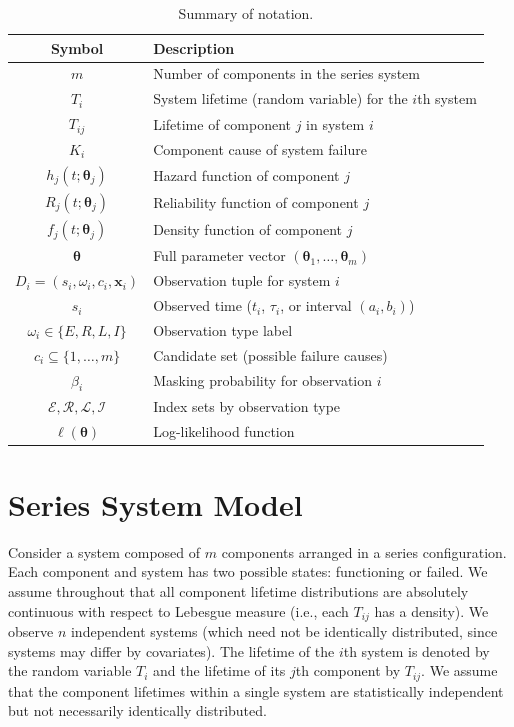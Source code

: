 \documentclass[11pt]{article}
\theoremstyle{definition}
\theoremstyle{plain}
\renewcommand{\v}[1]{\boldsymbol{#1}}
\newcommand{\btheta}{\v{\theta}}
\begin{document}
\begin{table}[ht]
\centering
\caption{Summary of notation.}
\label{tab:notation}
\small
\renewcommand{\arraystretch}{1.15}
\begin{tabular}{@{}cl@{}}
\toprule
\textbf{Symbol} & \textbf{Description} \\
\midrule
$m$ & Number of components in the series system \\
$T_i$ & System lifetime (random variable) for the $i$th system \\
$T_{ij}$ & Lifetime of component $j$ in system $i$ \\
$K_i$ & Component cause of system failure \\
$h_j(t; \v{\theta}_j)$ & Hazard function of component $j$ \\
$R_j(t; \v{\theta}_j)$ & Reliability function of component $j$ \\
$f_j(t; \v{\theta}_j)$ & Density function of component $j$ \\
$\btheta$ & Full parameter vector $(\v{\theta}_1, \ldots, \v{\theta}_m)$ \\
$D_i = (s_i, \omega_i, c_i, \v{x}_i)$ & Observation tuple for system $i$ \\
$s_i$ & Observed time ($t_i$, $\tau_i$, or interval $(a_i, b_i)$) \\
$\omega_i \in \{E, R, L, I\}$ & Observation type label \\
$c_i \subseteq \{1,\ldots,m\}$ & Candidate set (possible failure causes) \\
$\beta_i$ & Masking probability for observation $i$ \\
$\mathcal{E}, \mathcal{R}, \mathcal{L}, \mathcal{I}$
    & Index sets by observation type \\
$\ell(\btheta)$ & Log-likelihood function \\
\bottomrule
\end{tabular}
\end{table}

\section{Series System Model}
\label{sec:series-system}

Consider a system composed of $m$ components arranged in a series
configuration.
Each component and system has two possible states: functioning or failed.
We assume throughout that all component lifetime distributions are
absolutely continuous with respect to Lebesgue measure (i.e., each
$T_{ij}$ has a density).
We observe $n$ independent systems (which need not be identically
distributed, since systems may differ by covariates).
The lifetime of the $i$th system is denoted by the random variable
$T_i$ and the lifetime of its $j$th component by $T_{ij}$.
We assume that the component lifetimes within a single system are
statistically independent but not necessarily identically distributed.
\end{document}
